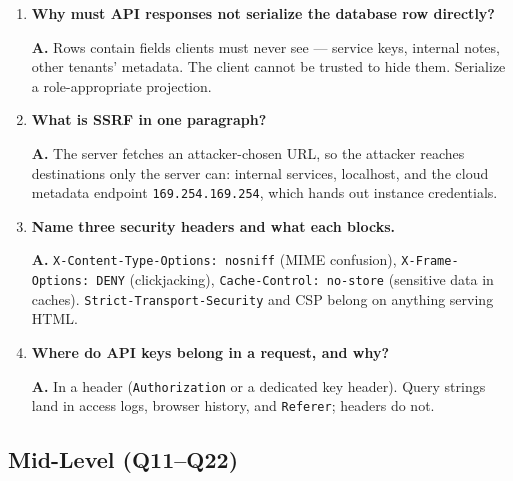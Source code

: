 \begin{enumerate}[label=\textbf{Q\arabic*.}, leftmargin=1.7cm, itemsep=0.9em]
        fields like \texttt{owner\_id} or \texttt{is\_admin}. Defense:
        explicit request schemas with \texttt{extra="forbid"} plus a
        role-keyed writable-field policy.
  \item \textbf{Why must API responses not serialize the database row
        directly?}\par
        \textbf{A.} Rows contain fields clients must never see --- service
        keys, internal notes, other tenants' metadata. The client cannot
        be trusted to hide them. Serialize a role-appropriate projection.
  \item \textbf{What is SSRF in one paragraph?}\par
        \textbf{A.} The server fetches an attacker-chosen URL, so the
        attacker reaches destinations only the server can: internal
        services, localhost, and the cloud metadata endpoint
        \texttt{169.254.169.254}, which hands out instance credentials.
  \item \textbf{Name three security headers and what each blocks.}\par
        \textbf{A.} \texttt{X-Content-Type-Options: nosniff} (MIME
        confusion), \texttt{X-Frame-Options: DENY} (clickjacking),
        \texttt{Cache-Control: no-store} (sensitive data in caches).
        \texttt{Strict-Transport-Security} and CSP belong on anything
        serving HTML.
  \item \textbf{Where do API keys belong in a request, and why?}\par
        \textbf{A.} In a header (\texttt{Authorization} or a dedicated
        key header). Query strings land in access logs, browser history,
        and \texttt{Referer}; headers do not.
\end{enumerate}

\subsection*{Mid-Level (Q11--Q22)}

